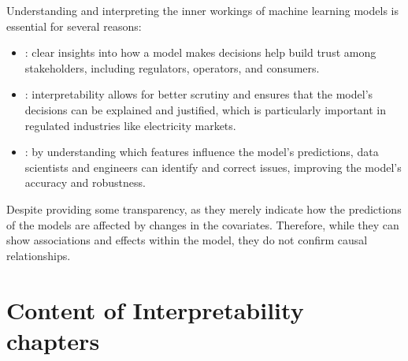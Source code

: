 \documentclass[letterpaper,10pt,english]{jupyterBook}
\begin{document}
\sphinxAtStartPar
Understanding and interpreting the inner workings of machine learning models is essential for several reasons:
\begin{itemize}
\item {} 
\sphinxAtStartPar
{}: clear insights into how a model makes decisions help build trust among stakeholders, including regulators, operators, and consumers.

\item {} 
\sphinxAtStartPar
{}: interpretability allows for better scrutiny and ensures that the model’s decisions can be explained and justified, which is particularly important in regulated industries like electricity markets.

\item {} 
\sphinxAtStartPar
{}: by understanding which features influence the model’s predictions, data scientists and engineers can identify and correct issues, improving the model’s accuracy and robustness.

\end{itemize}

\sphinxAtStartPar
Despite providing some transparency,  as they merely indicate how the predictions of the models are affected by changes in the covariates. Therefore, while they can show associations and effects within the model, they do not confirm causal relationships.


\section{Content of Interpretability chapters}
\label{\detokenize{notebooks/preface_interpretability:content-of-interpretability-chapters}}
\end{document}

